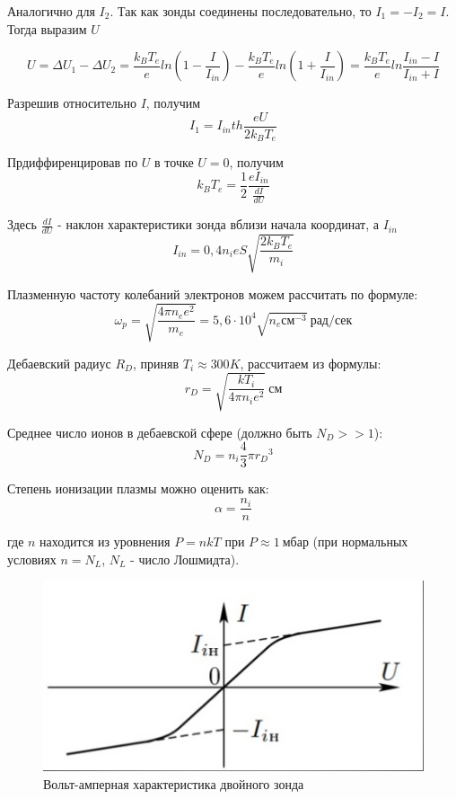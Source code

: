 \documentclass[a4paper, 14pt]{extarticle}%
\newcommand\ECaption[1]{%
     \captionsetup{font=footnotesize}%
     \caption{#1}}
\newcommand\ECaption[1]{%
     \captionsetup{font=footnotesize}%
     \caption{#1}}
\begin{document}
Аналогично для $I_{2}$. Так как зонды соединены последовательно, то $I_{1} = -I_{2} = I$. Тогда выразим $U$ 

\[ U = \Delta U_{1} - \Delta U_{2} = \frac{k_{B} T_{e}}{e} ln{(1 - \frac{I}{I_{in}})} - \frac{k_{B} T_{e}}{e} ln{(1 + \frac{I}{I_{in}})}  = \frac{k_{B} T_{e}}{e} ln{\frac{I_{in} - I}{I_{in} + I}} \]

Разрешив относительно $I$, получим
\begin{equation}
   I_{1} = I_{in} th{\frac{e U}{2 k_{B} T_{e}}}
\end{equation}

Прдиффиренцировав по $U$ в точке $U = 0$, получим
\begin{equation}
   k_{B} T_{e} = \frac{1}{2} \frac{e I_{in}}{\frac{dI}{dU}}
\end{equation}

Здесь $\frac{dI}{dU}$ - наклон характеристики зонда вблизи начала координат, а  $ I_{in} $
\begin{equation}
I_{in} = 0,4 n_{i} e S \sqrt{\frac{2 k_{B} T_{e}}{m_{i}}}
\end{equation}

Плазменную частоту колебаний электронов можем рассчитать по формуле:
\begin{equation}
\omega_{p} = \sqrt{\frac{4 \pi n_{e} e^2}{m_{e}}} = 5,6 \cdot 10^4 \sqrt{n_{e} \text{см}^{-3}} \: \text{рад/сек}  
\end{equation}

Дебаевский радиус $R_{D}$, приняв $ T_{i} \approx  300 K $, рассчитаем из формулы:
\begin{equation}
r_{D} = \sqrt{\frac{k T_{i}}{4 \pi n_{i} e^2}} \: \text{см}
\end{equation}

Среднее число ионов в дебаевской сфере (должно быть $ N_{D} >> 1$):
\begin{equation}
N_{D} = n_{i} \frac{4}{3} \pi {r_{D}}^3
\end{equation}

Степень ионизации плазмы можно оценить как:
\begin{equation}
\alpha = \frac{n_{i}}{n}
\end{equation}

где $n$ находится из уровнения $P = n k T $ при $P \approx 1 \: \text{мбар}$ (при нормальных условиях $n= N_{L}$, $N_{L}$ - число Лошмидта).


\begin{figure}[h!]
\begin{center}
\includegraphics[width=0.7 \textwidth]{zalupa_vodolaza.jpg}
\end{center}
\ECaption{Вольт-амперная характеристика двойного зонда}
\end{figure}
\end{document}
